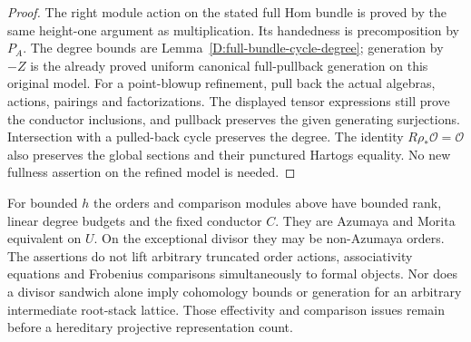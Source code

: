 \begin{proof}
The right module action on the stated full Hom bundle is
proved by the same height-one argument as multiplication.
Its handedness is precomposition by $P_A$.
The degree bounds are Lemma~\ref{D:full-bundle-cycle-degree};
generation by $-Z$ is the already proved uniform canonical
full-pullback generation on this original model.
For a point-blowup refinement, pull back the actual algebras,
actions, pairings and factorizations. The displayed tensor
expressions still prove the conductor inclusions, and
pullback preserves the given generating surjections.
Intersection with a pulled-back cycle preserves the degree.
The identity $R\rho_*\mathcal O=\mathcal O$ also preserves
the global sections and their punctured Hartogs equality.
No new fullness assertion on the refined model is needed.
\end{proof}

\begin{remark}
For bounded $h$ the orders and comparison modules above have
bounded rank, linear degree budgets and the fixed conductor
$C$. They are Azumaya and Morita equivalent on $U$.
On the exceptional divisor they may be non-Azumaya orders.
The assertions do not lift arbitrary truncated order actions,
associativity equations and Frobenius comparisons simultaneously
to formal objects. Nor does a divisor sandwich alone imply
cohomology bounds or generation for an arbitrary intermediate
root-stack lattice. Those effectivity and comparison issues
remain before a hereditary projective representation count.
\end{remark}
